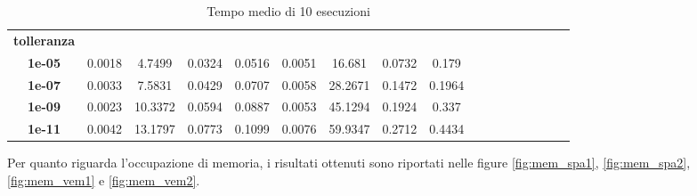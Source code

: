 \begin{table}[!ht]
\begin{subtable}[!ht]{1\textwidth}
{\begin{tabular}{|c|c|c|c|c|c|c|c|c|c|c|c|c|c|c|c|c|}
                \textbf{tolleranza} & ~                 & ~                 & ~             & ~             & ~                 & ~                 & ~             & ~             \\
                \textbf{1e-05}      & 0.0018            & 4.7499            & 0.0324        & 0.0516        & 0.0051            & 16.681            & 0.0732        & 0.179         \\
                \textbf{1e-07}      & 0.0033            & 7.5831            & 0.0429        & 0.0707        & 0.0058            & 28.2671           & 0.1472        & 0.1964        \\
                \textbf{1e-09}      & 0.0023            & 10.3372           & 0.0594        & 0.0887        & 0.0053            & 45.1294           & 0.1924        & 0.337         \\
                \textbf{1e-11}      & 0.0042            & 13.1797           & 0.0773        & 0.1099        & 0.0076            & 59.9347           & 0.2712        & 0.4434        \\
            \end{tabular}}
        \caption{Vem 1 e Vem 2}
        \label{tab:vem_time}
    \end{subtable}
    \caption{Tempo medio di 10 esecuzioni}
    \label{tab:times}
\end{table}

Per quanto riguarda l'occupazione di memoria, i risultati ottenuti sono riportati
nelle figure \ref{fig:mem_spa1}, \ref{fig:mem_spa2}, \ref{fig:mem_vem1} e \ref{fig:mem_vem2}.


